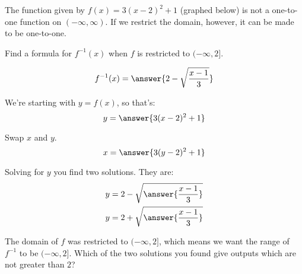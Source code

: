 \documentclass{ximera}
\author{Bobby Ramsey}
\begin{document}
\begin{exercise}

	The function given by $f(x)=3(x-2)^2+1$ (graphed below) is not a one-to-one function on $(-\infty, \infty)$.  If we restrict the domain, however,
	it can be made to be one-to-one.
	
	\begin{image}
	\end{image}
	
	Find a formula for $f^{-1}(x)$ when $f$ is restricted to $(-\infty, 2]$.
	
	
	\[ f^{-1}(x) = \answer{2-\sqrt{\frac{x-1}{3}}}\]
	\begin{hint}
		We're starting with $y = f(x)$, so that's:
		\[ y = \answer{3(x-2)^2+1} \]
		
		Swap $x$ and $y$.
		\[ x = \answer{3(y-2)^2+1} \]
		
		Solving for $y$ you find two solutions.  They are:
		\begin{align*}
			y &= 2-\sqrt{\answer{\frac{x-1}{3}}} \\
			y &= 2+\sqrt{\answer{\frac{x-1}{3}}}
		\end{align*}
		
		The domain of $f$ was restricted to $(-\infty, 2]$, which means we want the range of $f^{-1}$ to be $(-\infty, 2]$.
		Which of the two solutions you found give outputs which are not greater than $2$?
	\end{hint}


\end{exercise}
\end{document}
